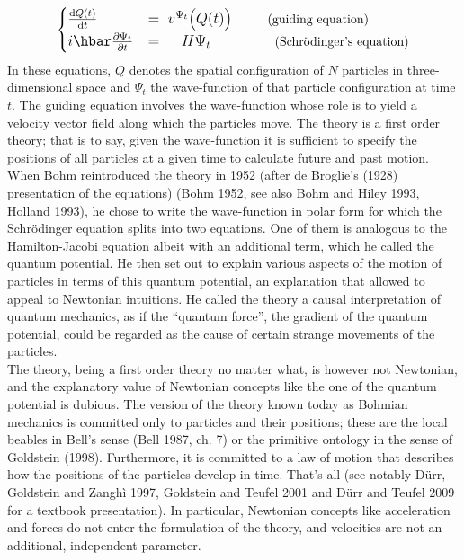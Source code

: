 \documentclass[12pt]{article}
\theoremstyle{definition}
\begin{document}
\begin{align*}
\large
\begin{cases} \frac{\mathrm{d} Q(t)}{\mathrm{d}t} &= \; v^{\Psi_t}\bigl(Q(t)\bigr) \hspace*{1cm} \text{\normalsize (guiding equation)}\\
i \hbar \frac{\partial \Psi_t}{\partial t} & = \hspace*{.5cm} H \Psi_t \hspace*{1.8cm} \text{\normalsize (Schr\"odinger's equation)}
\end{cases}
\end{align*}
In these equations, $Q$ denotes the spatial configuration of $N$ particles in three-dimensional space and $\Psi_t$ the wave-function of that particle configuration at time $t$. The guiding equation involves the wave-function whose role is to yield a velocity vector field along which the particles move. The theory is a first order theory; that is to say, given the wave-function it is sufficient to specify the positions of all particles at a given time to calculate future and past motion.\\
When Bohm reintroduced the theory in 1952 (after de Broglie's (1928) presentation of the equations) (Bohm 1952, see also Bohm and Hiley 1993, Holland 1993), he chose to write the wave-function in polar form for which the Schr\"odinger equation splits into two equations. One of them is analogous to the Hamilton-Jacobi equation albeit with an additional term, which he called the quantum potential. He then set out to explain various aspects of the motion of particles in terms of this quantum potential, an explanation that allowed to appeal to Newtonian intuitions. He called the theory a causal interpretation of quantum mechanics, as if the ``quantum force'', the gradient of the quantum potential, could be regarded as the cause of certain strange movements of the particles.\\
The theory, being a first order theory no matter what, is however not Newtonian, and the explanatory value of Newtonian concepts like the one of the quantum potential is dubious. The version of the theory known today as Bohmian mechanics is committed only to particles and their positions; these are the local beables in Bell's sense (Bell 1987, ch. 7) or the primitive ontology in the sense of Goldstein (1998). Furthermore, it is committed to a law of motion that describes how the positions of the particles develop in time. That's all (see notably D\"urr, Goldstein and Zangh\`i 1997, Goldstein and Teufel 2001 and D\"urr and Teufel 2009 for a textbook presentation). In particular, Newtonian concepts like acceleration and forces do not enter the formulation of the theory, and velocities are not an additional, independent parameter.\\
\end{document}
